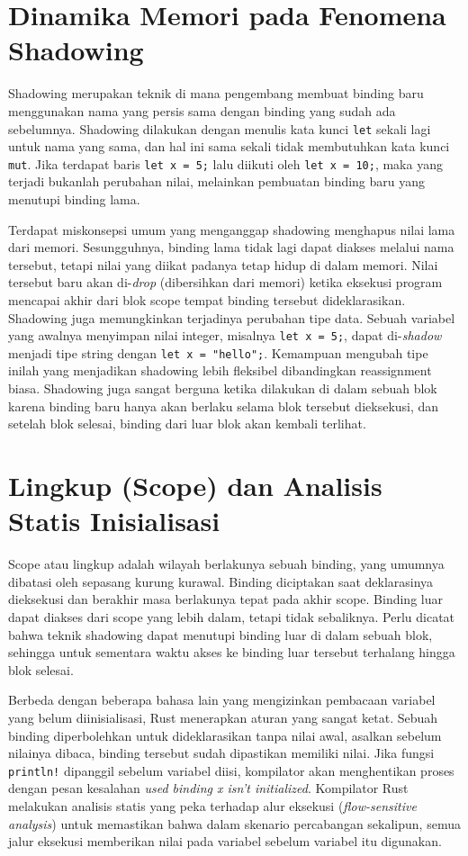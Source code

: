 \documentclass[11pt,a4paper]{article}
\begin{document}
\section{Dinamika Memori pada Fenomena Shadowing}

Shadowing merupakan teknik di mana pengembang membuat binding baru menggunakan nama yang persis sama dengan binding yang sudah ada sebelumnya. Shadowing dilakukan dengan menulis kata kunci \texttt{let} sekali lagi untuk nama yang sama, dan hal ini sama sekali tidak membutuhkan kata kunci \texttt{mut}. Jika terdapat baris \texttt{let x = 5;} lalu diikuti oleh \texttt{let x = 10;}, maka yang terjadi bukanlah perubahan nilai, melainkan pembuatan binding baru yang menutupi binding lama.

Terdapat miskonsepsi umum yang menganggap shadowing menghapus nilai lama dari memori. Sesungguhnya, binding lama tidak lagi dapat diakses melalui nama tersebut, tetapi nilai yang diikat padanya tetap hidup di dalam memori. Nilai tersebut baru akan di-\textit{drop} (dibersihkan dari memori) ketika eksekusi program mencapai akhir dari blok scope tempat binding tersebut dideklarasikan. Shadowing juga memungkinkan terjadinya perubahan tipe data. Sebuah variabel yang awalnya menyimpan nilai integer, misalnya \texttt{let x = 5;}, dapat di-\textit{shadow} menjadi tipe string dengan \texttt{let x = "hello";}. Kemampuan mengubah tipe inilah yang menjadikan shadowing lebih fleksibel dibandingkan reassignment biasa. Shadowing juga sangat berguna ketika dilakukan di dalam sebuah blok karena binding baru hanya akan berlaku selama blok tersebut dieksekusi, dan setelah blok selesai, binding dari luar blok akan kembali terlihat.

\section{Lingkup (Scope) dan Analisis Statis Inisialisasi}

Scope atau lingkup adalah wilayah berlakunya sebuah binding, yang umumnya dibatasi oleh sepasang kurung kurawal. Binding diciptakan saat deklarasinya dieksekusi dan berakhir masa berlakunya tepat pada akhir scope. Binding luar dapat diakses dari scope yang lebih dalam, tetapi tidak sebaliknya. Perlu dicatat bahwa teknik shadowing dapat menutupi binding luar di dalam sebuah blok, sehingga untuk sementara waktu akses ke binding luar tersebut terhalang hingga blok selesai.

Berbeda dengan beberapa bahasa lain yang mengizinkan pembacaan variabel yang belum diinisialisasi, Rust menerapkan aturan yang sangat ketat. Sebuah binding diperbolehkan untuk dideklarasikan tanpa nilai awal, asalkan sebelum nilainya dibaca, binding tersebut sudah dipastikan memiliki nilai. Jika fungsi \texttt{println!} dipanggil sebelum variabel diisi, kompilator akan menghentikan proses dengan pesan kesalahan \textit{used binding x isn't initialized}. Kompilator Rust melakukan analisis statis yang peka terhadap alur eksekusi (\textit{flow-sensitive analysis}) untuk memastikan bahwa dalam skenario percabangan sekalipun, semua jalur eksekusi memberikan nilai pada variabel sebelum variabel itu digunakan.
\end{document}
